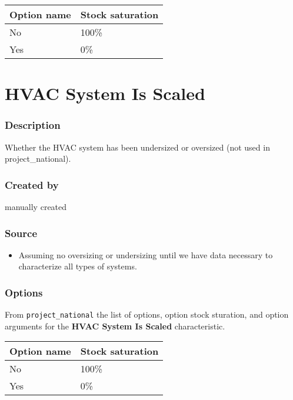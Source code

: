 \begin{longtable}[]{@{}ll@{}}
\toprule\noalign{}
Option name & Stock saturation \\
\midrule\noalign{}
\endhead
\bottomrule\noalign{}
\endlastfoot
No & 100\% \\
Yes & 0\% \\
\end{longtable}

\section{HVAC System Is Scaled}\label{hvac_system_is_scaled}

\subsubsection{Description}\label{description-80}

Whether the HVAC system has been undersized or oversized (not used in
project\_national).

\subsubsection{Created by}\label{created-by-80}

manually created

\subsubsection{Source}\label{source-79}

\begin{itemize}
 
\item
  Assuming no oversizing or undersizing until we have data necessary to
  characterize all types of systems.
\end{itemize}

\subsubsection{Options}\label{options-80}

From \texttt{project\_national} the list of options, option stock
sturation, and option arguments for the \textbf{HVAC System Is Scaled}
characteristic.

\begin{longtable}[]{@{}ll@{}}
\toprule\noalign{}
Option name & Stock saturation \\
\midrule\noalign{}
\endhead
\bottomrule\noalign{}
\endlastfoot
No & 100\% \\
Yes & 0\% \\
\end{longtable}

